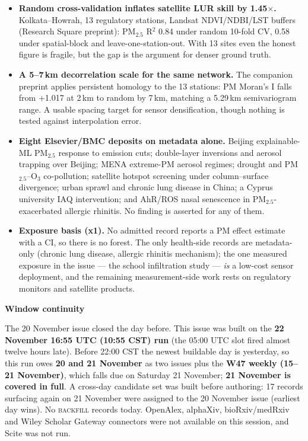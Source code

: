 \documentclass[10pt]{article}
\begin{document}
\footnotesize
\begin{itemize}

\item \textbf{Random cross-validation inflates satellite LUR skill by 1.45$\times$.} Kolkata--Howrah, 13 regulatory stations, Landsat NDVI/NDBI/LST buffers (Research Square preprint): PM$_{2.5}$ R$^2$ 0.84 under random 10-fold CV, 0.58 under spatial-block and leave-one-station-out. With 13 sites even the honest figure is fragile, but the gap is the argument for denser ground truth.

\item \textbf{A 5--7\,km decorrelation scale for the same network.} The companion preprint applies persistent homology to the 13 stations: PM Moran's I falls from +1.017 at 2\,km to random by 7\,km, matching a 5.29\,km semivariogram range. A usable spacing target for sensor densification, though nothing is tested against interpolation error.

\item \textbf{Eight Elsevier/BMC deposits on metadata alone.} Beijing explainable-ML PM$_{2.5}$ response to emission cuts; double-layer inversions and aerosol trapping over Beijing; MENA extreme-PM aerosol regimes; drought and PM$_{2.5}$--O$_3$ co-pollution; satellite hotspot screening under column--surface divergence; urban sprawl and chronic lung disease in China; a Cyprus university IAQ intervention; and AhR/ROS nasal senescence in PM$_{2.5}$-exacerbated allergic rhinitis. No finding is asserted for any of them.

\item \textbf{Exposure basis (x1).} No admitted record reports a PM effect estimate with a CI, so there is no forest. The only health-side records are metadata-only (chronic lung disease, allergic rhinitis mechanism); the one measured exposure in the issue --- the school infiltration study --- \emph{is} a low-cost sensor deployment, and the remaining measurement-side work rests on regulatory monitors and satellite products.

\end{itemize}

\vspace{2mm}

\begin{keybox}
{\sffamily\bfseries\footnotesize\color{Deep}Window continuity}\\[1.2mm]
{\fontsize{7.2}{8.8}\selectfont
The 20 November issue closed the day before. This issue was built on the \textbf{22 November 16:55 UTC (10:55 CST) run} (the 05:00 UTC slot fired almost twelve hours late). Before 22:00 CST the newest buildable day is yesterday, so this run owes \textbf{20 and 21 November} as two issues plus the \textbf{W47 weekly (15--21 November)}, which falls due on Saturday 21 November; \textbf{21 November is covered in full}. A cross-day candidate set was built before authoring: 17 records surfacing again on 21 November were assigned to the 20 November issue (earliest day wins). No \textsc{backfill} records today. OpenAlex, alphaXiv, bioRxiv/medRxiv and Wiley Scholar Gateway connectors were not available on this session, and Scite was not run.\par}
\end{keybox}
\end{document}
